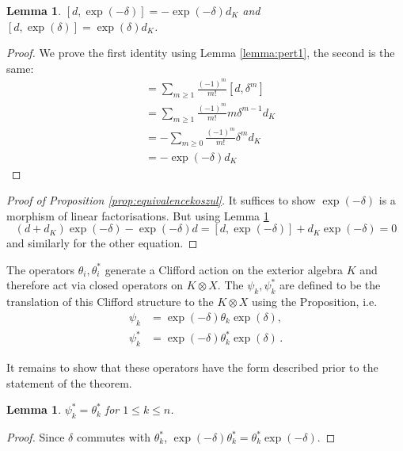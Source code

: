 \documentclass[english,letter paper,12pt,leqno]{article}
\newtheorem{lemma}[theorem]{Lemma}
\theoremstyle{example}
\numberwithin{equation}{section}
\begin{document}
\begin{lemma}\label{lemma:pert2} $[ d, \exp(-\delta) ] = - \exp(-\delta) d_K$ and $[ d, \exp(\delta) ] = \exp(\delta) d_K$.
\end{lemma}
\begin{proof}
We prove the first identity using Lemma \ref{lemma:pert1}, the second is the same:
\begin{align*}
[d, \exp(-\delta)] &= \sum_{m \ge 1} \frac{(-1)^m}{m!} [ d, \delta^m ]\\
&= \sum_{m \ge 1} \frac{(-1)^m}{m!} m \delta^{m-1} d_K\\
&= - \sum_{m \ge 0} \frac{(-1)^m}{m!} \delta^m d_K\\
&= - \exp(-\delta) d_K
\end{align*}
\end{proof}

\begin{proof}[Proof of Proposition \ref{prop:equivalencekoszul}]
It suffices to show $\exp(-\delta)$ is a morphism of linear factorisations. But using Lemma \ref{lemma:pert2}
\[
(d + d_K) \exp(-\delta) - \exp(-\delta) d = [d, \exp(-\delta)] + d_K \exp(-\delta) = 0
\]
and similarly for the other equation.
\end{proof}

The operators $\theta_i, \theta_i^*$ generate a Clifford action on the exterior algebra $K$ and therefore act via closed operators on $K \otimes X$. The $\psi_k, \psi_k^*$ are defined to be the translation of this Clifford structure to the $K \otimes X$ using the Proposition, i.e.
\begin{align}
\psi_k &= \exp(-\delta) \theta_k \exp(\delta), \label{eq:defn_psik1}\\
\psi_k^{*} &= \exp(-\delta) \theta_k^* \exp(\delta)\,. \label{eq:defn_psik2}
\end{align}

It remains to show that these operators have the form described prior to the statement of the theorem.

\begin{lemma} $\psi_k^{*} = \theta_k^*$ for $1 \le k \le n$.
\end{lemma}
\begin{proof}
Since $\delta$ commutes with $\theta_k^*$, $\exp(-\delta) \theta_k^* = \theta_k^* \exp(-\delta)$.
\end{proof}
\end{document}
